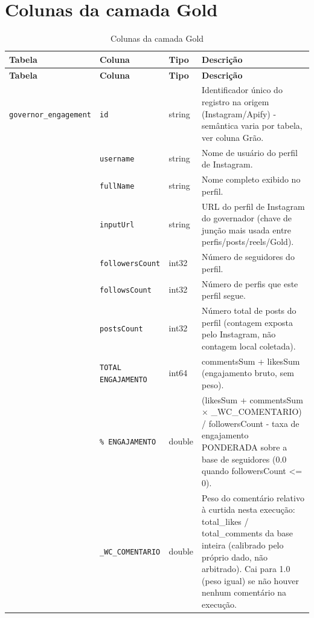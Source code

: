 \section*{Colunas da camada Gold}
\begin{footnotesize}
\begin{longtable}{p{3.2cm}p{3.0cm}p{2.0cm}p{6.0cm}}
\caption{Colunas da camada Gold}\\
\toprule \textbf{Tabela} & \textbf{Coluna} & \textbf{Tipo} & \textbf{Descrição} \\ \midrule \endfirsthead
\toprule \textbf{Tabela} & \textbf{Coluna} & \textbf{Tipo} & \textbf{Descrição} \\ \midrule \endhead
\bottomrule \endfoot
\texttt{governor\_\allowbreak{}engagement} & \texttt{id} & string & Identificador único do registro na origem (Instagram/\allowbreak{}Apify) - semântica varia por tabela, ver coluna Grão. \\
\texttt{} & \texttt{username} & string & Nome de usuário do perfil de Instagram. \\
\texttt{} & \texttt{fullName} & string & Nome completo exibido no perfil. \\
\texttt{} & \texttt{inputUrl} & string & URL do perfil de Instagram do governador (chave de junção mais usada entre perfis/\allowbreak{}posts/\allowbreak{}reels/\allowbreak{}Gold). \\
\texttt{} & \texttt{followersCount} & int32 & Número de seguidores do perfil. \\
\texttt{} & \texttt{followsCount} & int32 & Número de perfis que este perfil segue. \\
\texttt{} & \texttt{postsCount} & int32 & Número total de posts do perfil (contagem exposta pelo Instagram, não contagem local coletada). \\
\texttt{} & \texttt{TOTAL ENGAJAMENTO} & int64 & commentsSum + likesSum (engajamento bruto, sem peso). \\
\texttt{} & \texttt{\% ENGAJAMENTO} & double & (likesSum + commentsSum × \_\allowbreak{}WC\_\allowbreak{}COMENTARIO) /\allowbreak{} followersCount - taxa de engajamento PONDERADA sobre a base de seguidores (0.0 quando followersCount <= 0). \\
\texttt{} & \texttt{\_\allowbreak{}WC\_\allowbreak{}COMENTARIO} & double & Peso do comentário relativo à curtida nesta execução: total\_\allowbreak{}likes /\allowbreak{} total\_\allowbreak{}comments da base inteira (calibrado pelo próprio dado, não arbitrado). Cai para 1.0 (peso igual) se não houver nenhum comentário na execução. \\

\end{longtable}
\end{footnotesize}
